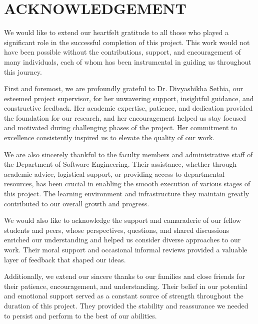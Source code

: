 \clearpage

\section*{\centering \large ACKNOWLEDGEMENT}

\vspace{2em}

\begin{doublespace}
  \justifying
  \noindent
  We would like to extend our heartfelt gratitude to all those who played a significant role in
  the successful completion of this project. This work would not have been possible without
  the contributions, support, and encouragement of many individuals, each of whom has
  been instrumental in guiding us throughout this journey.

  \vspace{1em}
  \noindent
  First and foremost, we are profoundly grateful to Dr. Divyashikha Sethia, our esteemed
  project supervisor, for her unwavering support, insightful guidance, and constructive feedback.
  Her academic expertise, patience, and dedication provided the foundation for our
  research, and her encouragement helped us stay focused and motivated during challenging
  phases of the project. Her commitment to excellence consistently inspired us to elevate
  the quality of our work.

  \vspace{1em}
  \noindent
  We are also sincerely thankful to the faculty members and administrative staff of the
  Department of Software Engineering. Their assistance, whether through academic advice,
  logistical support, or providing access to departmental resources, has been crucial in
  enabling the smooth execution of various stages of this project. The learning environment
  and infrastructure they maintain greatly contributed to our overall growth and progress.

  \vspace{1em}
  \noindent
  We would also like to acknowledge the support and camaraderie of our fellow students and
  peers, whose perspectives, questions, and shared discussions enriched our understanding
  and helped us consider diverse approaches to our work. Their moral support and occasional
  informal reviews provided a valuable layer of feedback that shaped our ideas.

  \vspace{1em}
  \noindent
  Additionally, we extend our sincere thanks to our families and close friends for their
  patience, encouragement, and understanding. Their belief in our potential and emotional
  support served as a constant source of strength throughout the duration of this project.
  They provided the stability and reassurance we needed to persist and perform to the best
  of our abilities.


\end{doublespace}
